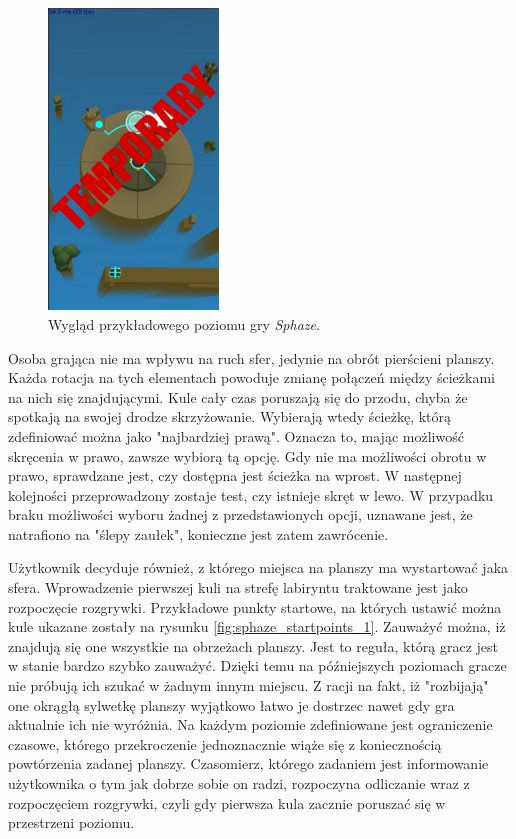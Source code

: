 \documentclass[a4paper,12pt,numbers=noenddot]{report}
\begin{document}
\begin{figure}[h!]
	\centering
  	\includegraphics[height=8cm]{fig/tmp.jpg}
	\caption{Wygląd przykładowego poziomu gry \textit{Sphaze}.}
	\label{fig:sphaze_1}
\end{figure}

Osoba grająca nie ma wpływu na ruch sfer, jedynie na obrót pierścieni planszy. Każda rotacja na tych elementach powoduje zmianę połączeń między ścieżkami na nich się znajdującymi. Kule cały czas poruszają się do przodu, chyba że spotkają na swojej drodze skrzyżowanie. Wybierają wtedy ścieżkę, którą zdefiniować można jako "najbardziej prawą". Oznacza to, mając możliwość skręcenia w prawo, zawsze wybiorą tą opcję. Gdy nie ma możliwości obrotu w prawo, sprawdzane jest, czy dostępna jest ścieżka na wprost. W następnej kolejności przeprowadzony zostaje test, czy istnieje skręt w lewo. W przypadku braku możliwości wyboru żadnej z przedstawionych opcji, uznawane jest, że natrafiono na "ślepy zaułek", konieczne jest zatem zawrócenie.

Użytkownik decyduje również, z którego miejsca na planszy ma wystartować jaka sfera. Wprowadzenie pierwszej kuli na strefę labiryntu traktowane jest jako rozpoczęcie rozgrywki. Przykładowe punkty startowe, na których ustawić można kule ukazane zostały na rysunku \ref{fig:sphaze_startpoints_1}. Zauważyć można, iż znajdują się one wszystkie na obrzeżach planszy. Jest to reguła, którą gracz jest w stanie bardzo szybko zauważyć. Dzięki temu na późniejszych poziomach gracze nie próbują ich szukać w żadnym innym miejscu. Z racji na fakt, iż "rozbijają" one okrągłą sylwetkę planszy wyjątkowo łatwo je dostrzec nawet gdy gra aktualnie ich nie wyróżnia. 
Na każdym poziomie zdefiniowane jest ograniczenie czasowe, którego przekroczenie jednoznacznie wiąże się z koniecznością powtórzenia zadanej planszy. Czasomierz, którego zadaniem jest informowanie użytkownika o tym jak dobrze sobie on radzi, rozpoczyna odliczanie wraz z rozpoczęciem rozgrywki, czyli gdy pierwsza kula zacznie poruszać się w przestrzeni poziomu. 
\end{document}
